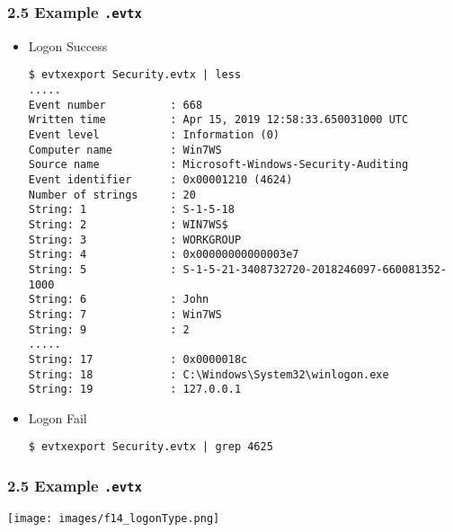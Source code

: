 \begin{frame}[fragile]
	\frametitle{2.5 Example \texttt{.evtx}}
    \begin{itemize}
        \item Logon Success
  \begin{lstlisting}[basicstyle=\tiny]
$ evtxexport Security.evtx | less
.....
Event number          : 668
Written time          : Apr 15, 2019 12:58:33.650031000 UTC
Event level           : Information (0)
Computer name         : Win7WS
Source name           : Microsoft-Windows-Security-Auditing
Event identifier      : 0x00001210 (4624)
Number of strings     : 20
String: 1             : S-1-5-18
String: 2             : WIN7WS$
String: 3             : WORKGROUP
String: 4             : 0x00000000000003e7
String: 5             : S-1-5-21-3408732720-2018246097-660081352-1000
String: 6             : John
String: 7             : Win7WS
String: 9             : 2
.....
String: 17            : 0x0000018c
String: 18            : C:\Windows\System32\winlogon.exe
String: 19            : 127.0.0.1
  \end{lstlisting}
        \item Logon Fail
  \begin{lstlisting}[basicstyle=\tiny]
$ evtxexport Security.evtx | grep 4625
  \end{lstlisting}
    \end{itemize}
\end{frame}


\begin{frame}[fragile]
	\frametitle{2.5 Example \texttt{.evtx}}
    \texttt{[image: images/f14\_logonType.png]}
\end{frame}


